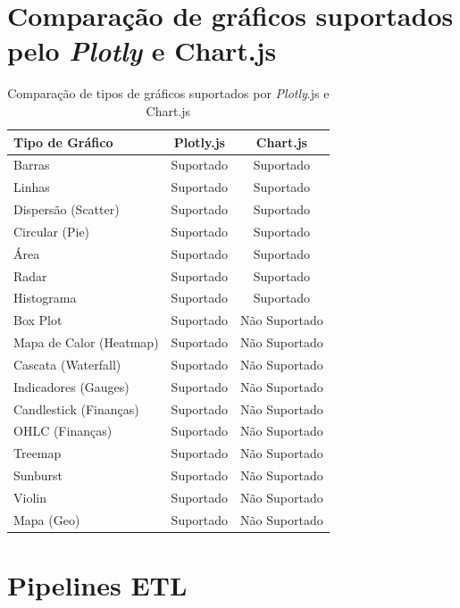 \chapter{Comparação de gráficos suportados pelo \textit{Plotly} e Chart.js}
\label{ch:charts}

\begin{table}[H]
\centering
\caption{Comparação de tipos de gráficos suportados por \textit{Plotly}.js e Chart.js}
\begin{tabular}{|l|c|c|}
\hline
\textbf{Tipo de Gráfico} & \textbf{Plotly.js} & \textbf{Chart.js} \\
\hline
Barras                         & Suportado & Suportado \\
Linhas                         & Suportado & Suportado \\
Dispersão (Scatter)            & Suportado & Suportado \\
Circular (Pie)                 & Suportado & Suportado \\
Área                           & Suportado & Suportado \\
Radar                          & Suportado & Suportado \\
Histograma                     & Suportado & Suportado \\
Box Plot                       & Suportado & Não Suportado \\
Mapa de Calor (Heatmap)        & Suportado & Não Suportado \\
Cascata (Waterfall)            & Suportado & Não Suportado \\
Indicadores (Gauges)           & Suportado & Não Suportado \\
Candlestick (Finanças)         & Suportado & Não Suportado \\
OHLC (Finanças)                & Suportado & Não Suportado \\
Treemap                        & Suportado & Não Suportado \\
Sunburst                       & Suportado & Não Suportado \\
Violin                         & Suportado & Não Suportado \\
Mapa (Geo)                     & Suportado & Não Suportado \\
\hline
\end{tabular}
\label{tab:charts}
\end{table}


\chapter{Pipelines ETL}
\label{ch:etl}

